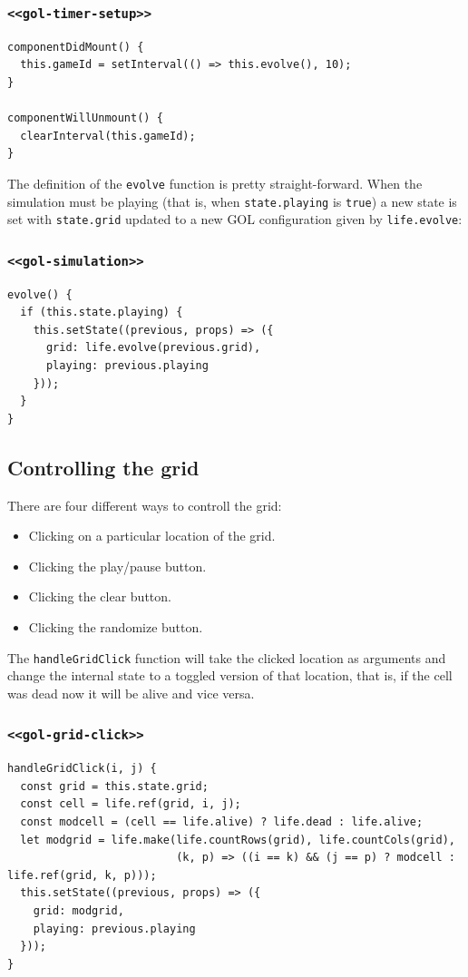 \documentclass[11pt]{article}
\begin{document}
\subsubsection{\texttt{<<gol-timer-setup>>}}
\label{sec:orgd936565}
\begin{verbatim}
componentDidMount() {
  this.gameId = setInterval(() => this.evolve(), 10);
}

componentWillUnmount() {
  clearInterval(this.gameId);
}
\end{verbatim}

The definition of the \texttt{evolve} function is pretty straight-forward. When the simulation must be playing (that is, when \texttt{state.playing} is \texttt{true}) a new state is set with \texttt{state.grid} updated to a new GOL configuration given by \texttt{life.evolve}:

\subsubsection{\texttt{<<gol-simulation>>}}
\label{sec:org9674564}
\begin{verbatim}
evolve() {
  if (this.state.playing) {
    this.setState((previous, props) => ({
      grid: life.evolve(previous.grid),
      playing: previous.playing
    }));
  }
}
\end{verbatim}

\subsection{Controlling the grid}
\label{sec:org71cdcc1}

There are four different ways to controll the grid:
\begin{itemize}
\item Clicking on a particular location of the grid.
\item Clicking the play/pause button.
\item Clicking the clear button.
\item Clicking the randomize button.
\end{itemize}

The \texttt{handleGridClick} function will take the clicked location as arguments and change the internal state to a toggled version of that location, that is, if the cell was dead now it will be alive and vice versa.

\subsubsection{\texttt{<<gol-grid-click>>}}
\label{sec:org9783406}
\begin{verbatim}
handleGridClick(i, j) {
  const grid = this.state.grid;
  const cell = life.ref(grid, i, j);
  const modcell = (cell == life.alive) ? life.dead : life.alive;
  let modgrid = life.make(life.countRows(grid), life.countCols(grid),
                          (k, p) => ((i == k) && (j == p) ? modcell : life.ref(grid, k, p)));
  this.setState((previous, props) => ({
    grid: modgrid,
    playing: previous.playing
  }));
}
\end{verbatim}
\end{document}
